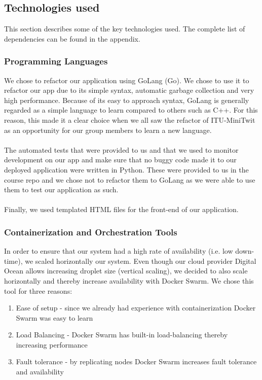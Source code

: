 \documentclass{article}
\begin{document}
\subsection{Technologies used}
This section describes some of the key technologies used. The complete list of dependencies can be found in the appendix.

\subsubsection{Programming Languages}We chose to refactor our application using GoLang (Go). We chose to use it to refactor our app due to its simple syntax, automatic garbage collection and very high performance. Because of its easy to approach syntax, GoLang is generally regarded as a simple language to learn compared to others such as C++. For this reason, this made it a clear choice when we all saw the refactor of ITU-MiniTwit as an opportunity for our group members to learn a new language.
\\\\
The automated tests that were provided to us and that we used to monitor development on our app and make sure that no buggy code made it to our deployed application were written in Python. These were provided to us in the course repo and we chose not to refactor them to GoLang as we were able to use them to test our application as such.
\\\\
Finally, we used templated HTML files for the front-end of our application.

\subsubsection{Containerization and Orchestration Tools}
In order to ensure that our system had a high rate of availability (i.e. low down-time), we scaled horizontally our system. Even though our cloud provider Digital Ocean allows increasing droplet size (vertical scaling), we decided to also scale horizontally and thereby increase availability with Docker Swarm. We chose this tool for three reasons: 

\begin{enumerate}
    \item Ease of setup - since we already had experience with containerization Docker Swarm was easy to learn
    \item Load Balancing - Docker Swarm has built-in load-balancing thereby increasing performance
    \item Fault tolerance - by replicating nodes Docker Swarm increases fault tolerance and availability
\end{enumerate}
\end{document}
